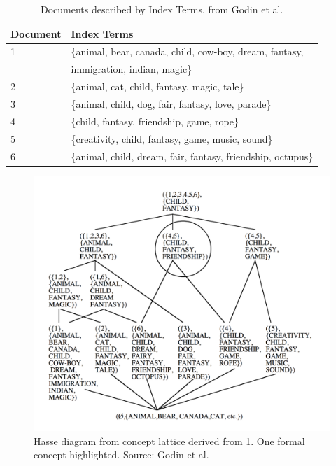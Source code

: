 \documentclass[11pt]{report}
\begin{document}
\begin{table}[h]
\caption{Documents described by Index Terms, from Godin et al. \cite{Godin1993}}
\label{table:fcair}
\centering

\def\arraystretch{1.2}%
\begin{tabular}{ | l | l | }
\hline
 Document & Index Terms \\
\hline

1 & \{animal, bear, canada, child, cow-boy, dream, fantasy,\\
  & immigration, indian, magic\} \\
2 & \{animal, cat, child, fantasy, magic, tale\} \\
3 & \{animal, child, dog, fair, fantasy, love, parade\} \\
4 & \{child, fantasy, friendship, game, rope\} \\
5 & \{creativity, child, fantasy, game, music, sound\} \\
6 & \{animal, child, dream, fair, fantasy, friendship, octupus\} \\

\hline
\end{tabular}
\end{table}

\begin{figure}[!ht]
	\centering
	\includegraphics[width=\linewidth]{./images/fcair}
\caption{Hasse diagram from concept lattice derived from \ref{table:fcair}. One formal concept highlighted. Source: Godin et al. \cite{Godin1993}}
\label{figure:fcair}
\end{figure}
\end{document}
